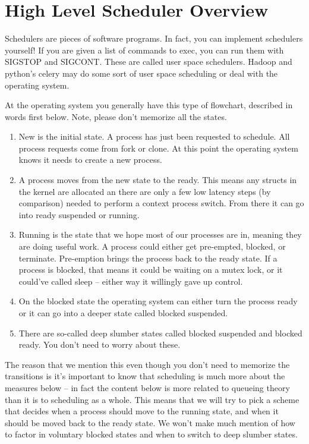 \section{High Level Scheduler Overview}

Schedulers are pieces of software programs. In fact, you can implement schedulers yourself! If you are given a list of commands to exec, you can run them with SIGSTOP and SIGCONT. These are called user space schedulers. Hadoop and python's celery may do some sort of user space scheduling or deal with the operating system.

At the operating system you generally have this type of flowchart, described in words first below. Note, please don't memorize all the states.

\begin{enumerate}
\item New is the initial state. A process has just been requested to schedule. All process requests come from fork or clone. At this point the operating system knows it needs to create a new process.
\item A process moves from the new state to the ready. This means any structs in the kernel are allocated an there are only a few low latency steps (by comparison) needed to perform a context process switch. From there it can go into ready suspended or running.
\item Running is the state that we hope most of our processes are in, meaning they are doing useful work. A process could either get pre-empted, blocked, or terminate. Pre-emption brings the process back to the ready state. If a process is blocked, that means it could be waiting on a mutex lock, or it could've called sleep -- either way it willingly gave up control.
\item On the blocked state the operating system can either turn the process ready or it can go into a deeper state called blocked suspended.
\item There are so-called deep slumber states called blocked suspended and blocked ready. You don't need to worry about these.
\end{enumerate}

The reason that we mention this even though you don't need to memorize the transitions is it's important to know that scheduling is much more about the measures below -- in fact the content below is more related to queueing theory than it is to scheduling as a whole. This means that we will try to pick a scheme that decides when a process should move to the running state, and when it should be moved back to the ready state. We won't make much mention of how to factor in voluntary blocked states and when to switch to deep slumber states.

